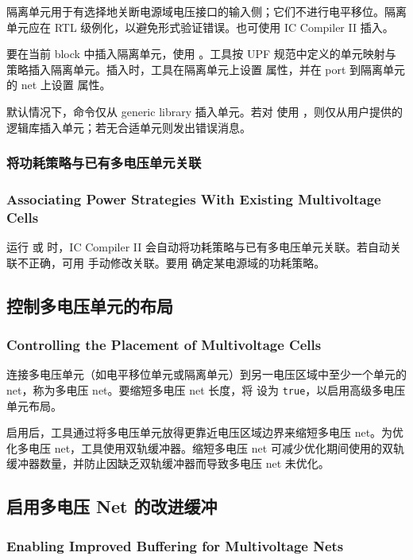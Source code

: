 隔离单元用于有选择地关断电源域电压接口的输入侧；它们不进行电平移位。隔离单元应在 RTL 级例化，以避免形式验证错误。也可使用 IC Compiler II 插入。

要在当前 block 中插入隔离单元，使用 。工具按 UPF 规范中定义的单元映射与策略插入隔离单元。插入时，工具在隔离单元上设置  属性，并在 port 到隔离单元的 net 上设置  属性。

默认情况下，命令仅从 generic library 插入单元。若对  使用 ，则仅从用户提供的逻辑库插入单元；若无合适单元则发出错误消息。

\subsubsection{将功耗策略与已有多电压单元关联}
\subsubsection*{Associating Power Strategies With Existing Multivoltage Cells}

运行  或  时，IC Compiler II 会自动将功耗策略与已有多电压单元关联。若自动关联不正确，可用  手动修改关联。要用  确定某电源域的功耗策略。

\subsection{控制多电压单元的布局}
\subsubsection*{Controlling the Placement of Multivoltage Cells}

连接多电压单元（如电平移位单元或隔离单元）到另一电压区域中至少一个单元的 net，称为多电压 net。要缩短多电压 net 长度，将  设为 \texttt{true}，以启用高级多电压单元布局。

启用后，工具通过将多电压单元放得更靠近电压区域边界来缩短多电压 net。为优化多电压 net，工具使用双轨缓冲器。缩短多电压 net 可减少优化期间使用的双轨缓冲器数量，并防止因缺乏双轨缓冲器而导致多电压 net 未优化。

\subsection{启用多电压 Net 的改进缓冲}
\subsubsection*{Enabling Improved Buffering for Multivoltage Nets}


